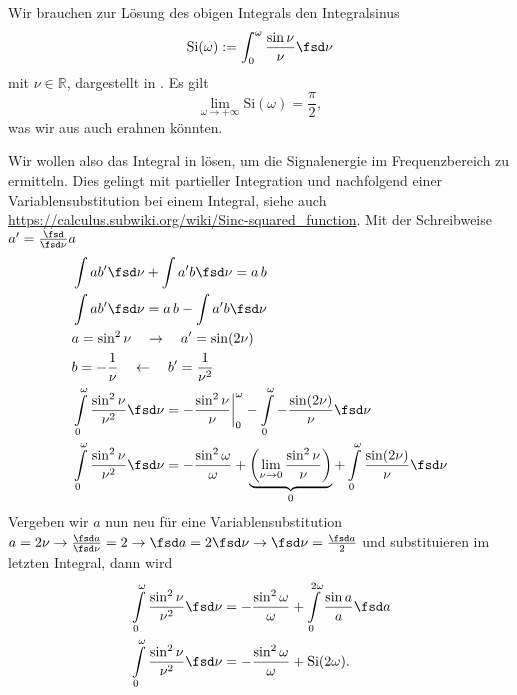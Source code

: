\begin{ExCalc}
Wir brauchen zur Lösung des obigen Integrals den Integralsinus
\begin{equation}
  \mathrm{Si}(\omega) := \int_{0}^{\omega} \frac{\sin \nu}{\nu} \fsd \nu
\end{equation}
mit $\nu\in\mathbb{R}$, dargestellt in .
Es gilt
\begin{equation}
  \lim_{\omega\to+\infty} \mathrm{Si}(\omega) = \frac{\pi}{2},
\end{equation}
was wir aus  auch erahnen könnten.

Wir wollen also das Integral in  lösen,
um die Signalenergie im Frequenzbereich zu ermitteln.
%
Dies gelingt mit partieller Integration und nachfolgend einer Variablensubstitution
bei einem Integral, siehe auch \url{https://calculus.subwiki.org/wiki/Sinc-squared_function}.
Mit der Schreibweise $a' = \frac{\fsd}{\fsd \nu} a$
\begin{align}
&\int a b' \fsd \nu + \int a' b \fsd \nu = a\,b\\
&\int a b' \fsd \nu = a\,b - \int a' b \fsd \nu\\
&a = \sin^2 \nu \quad\rightarrow\quad a'=\sin(2 \nu)\\ %
&b=-\frac{1}{\nu} \quad\leftarrow\quad b'=\frac{1}{\nu^2}\\
&\int\limits_0^\omega \frac{\sin^2 \nu}{\nu^2} \fsd \nu  =
-\frac{\sin^2 \nu}{\nu}\bigg|_0^\omega
- \int\limits_0^\omega -\frac{\sin(2 \nu)}{\nu} \fsd \nu\\
&\int\limits_0^\omega \frac{\sin^2 \nu}{\nu^2} \fsd \nu  =
-\frac{\sin^2 \omega}{\omega}
+\underbrace{\left(\lim_{\nu\to 0}\frac{\sin^2 \nu}{\nu}\right)}_{0}
+ \int\limits_0^\omega \frac{\sin(2 \nu)}{\nu} \fsd \nu
\end{align}
%
Vergeben wir $a$ nun neu für eine Variablensubstitution
$a = 2 \nu\rightarrow\frac{\fsd a}{\fsd \nu} = 2\rightarrow\fsd a = 2 \fsd \nu\rightarrow\fsd \nu = \frac{\fsd a}{2}$
und substituieren im letzten Integral, dann wird
\begin{align}
&\int\limits_0^\omega \frac{\sin^2 \nu}{\nu^2} \fsd \nu  =
-\frac{\sin^2 \omega}{\omega} + \int\limits_0^{2 \omega} \frac{\sin a}{a} \fsd a \\
&\int\limits_0^\omega \frac{\sin^2 \nu}{\nu^2} \fsd \nu  =
- \frac{\sin^2 \omega}{\omega} + \mathrm{Si}(2 \omega).
\end{align}

\end{ExCalc}
